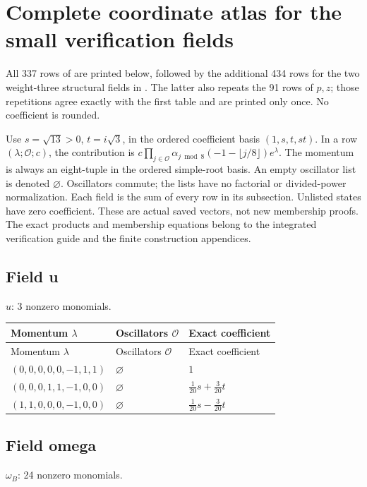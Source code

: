 \section{Complete coordinate atlas for the small verification fields}
\label{expdata:coordinates}
All 337 rows of 
are printed below, followed by the additional 434 rows for the two
weight-three structural fields in
. The latter
also repeats the 91 rows of $p,z$; those repetitions agree exactly with
the first table and are printed only once. No coefficient is rounded.

Use $s=\sqrt{13}>0$, $t=i\sqrt3$, in the ordered coefficient basis
$(1,s,t,st)$. In a row $(\lambda;\mathcal O;c)$, the contribution is
$c\prod_{j\in\mathcal O}\alpha_{j\bmod8}(-1-\lfloor j/8\rfloor)e^\lambda$.
The momentum is always an eight-tuple in the ordered simple-root basis.
An empty oscillator list is denoted $\varnothing$. Oscillators commute;
the lists have no factorial or divided-power normalization. Each field
is the sum of every row in its subsection. Unlisted states have zero
coefficient. These are actual saved vectors, not new membership proofs.
The exact products and membership equations belong to the integrated
verification guide and the finite construction appendices.

\subsection{Field u}
$u$: 3 nonzero monomials.

\begingroup\scriptsize
\setlength{\tabcolsep}{5pt}
\begin{longtable}{@{}lll@{}}
\toprule
Momentum $\lambda$ & Oscillators $\mathcal O$ & Exact coefficient\\
\midrule\endfirsthead
\toprule
Momentum $\lambda$ & Oscillators $\mathcal O$ & Exact coefficient\\
\midrule\endhead
\bottomrule\endfoot
$(0,0,0,0,0,-1,1,1)$ & $\varnothing$ & $1$\\
$(0,0,0,1,1,-1,0,0)$ & $\varnothing$ & $\frac{1}{20}s+\frac{3}{20}t$\\
$(1,1,0,0,0,-1,0,0)$ & $\varnothing$ & $\frac{1}{20}s-\frac{3}{20}t$\\
\end{longtable}
\endgroup

\subsection{Field omega}
$\omega_B$: 24 nonzero monomials.

